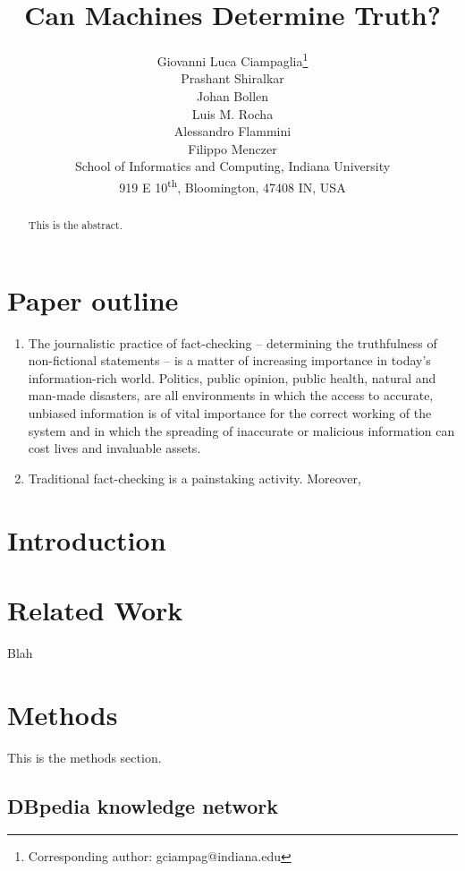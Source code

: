 \documentclass{article}
\author{
    Giovanni Luca Ciampaglia\thanks{Corresponding author: gciampag@indiana.edu} \\
    Prashant Shiralkar \\
    Johan Bollen \\
    Luis M. Rocha \\
    Alessandro Flammini \\
    Filippo Menczer \\[1em]
    {\small School of Informatics and Computing, Indiana University }\\
    {\small 919 E 10\textsuperscript{th}, Bloomington, 47408 IN, USA}
}
\title{Can Machines Determine Truth?}
\date{}
\begin{document}
\maketitle

\begin{abstract}
	This is the abstract.
\end{abstract}

\section*{Paper outline}

\begin{enumerate}

    \item The journalistic practice of fact-checking -- determining the
        truthfulness of non-fictional statements -- is a matter of increasing
        importance in today's information-rich world. Politics, public opinion,
        public health, natural and man-made disasters, are all environments in
        which the access to accurate, unbiased information is of vital
        importance for the correct working of the system and in which the
        spreading of inaccurate or malicious information can cost lives and
        invaluable assets.

    \item Traditional fact-checking is a painstaking activity. Moreover,
        \cite{VariousAuthors2010}
        

\end{enumerate}

\section{Introduction}

\section{Related Work}

Blah

\section{Methods}

This is the methods section.

\subsection{DBpedia knowledge network}
\end{document}
